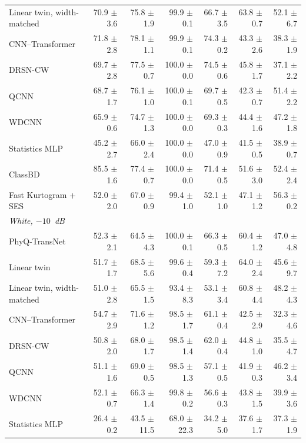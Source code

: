 \begin{table}[p]
\begin{tabular}{lrrrrrr}
Linear twin, width-matched & 70.9 $\pm$ 3.6 & 75.8 $\pm$ 1.9 & 99.9 $\pm$ 0.1 & 66.7 $\pm$ 3.5 & 63.8 $\pm$ 0.7 & 52.1 $\pm$ 6.7 \\
CNN--Transformer & 71.8 $\pm$ 2.8 & 78.1 $\pm$ 1.1 & 99.9 $\pm$ 0.1 & 74.3 $\pm$ 0.2 & 43.3 $\pm$ 2.6 & 38.3 $\pm$ 1.9 \\
DRSN-CW & 69.7 $\pm$ 2.8 & 77.5 $\pm$ 0.7 & 100.0 $\pm$ 0.0 & 74.5 $\pm$ 0.6 & 45.8 $\pm$ 1.7 & 37.1 $\pm$ 2.2 \\
QCNN & 68.7 $\pm$ 1.7 & 76.1 $\pm$ 1.0 & 100.0 $\pm$ 0.1 & 69.7 $\pm$ 0.5 & 42.3 $\pm$ 0.7 & 51.4 $\pm$ 2.2 \\
WDCNN & 65.9 $\pm$ 0.6 & 74.7 $\pm$ 1.3 & 100.0 $\pm$ 0.0 & 69.3 $\pm$ 0.3 & 44.4 $\pm$ 1.6 & 47.2 $\pm$ 1.8 \\
Statistics MLP & 45.2 $\pm$ 2.7 & 66.0 $\pm$ 2.4 & 100.0 $\pm$ 0.0 & 47.0 $\pm$ 0.9 & 41.5 $\pm$ 0.5 & 38.9 $\pm$ 0.7 \\
ClassBD & 85.5 $\pm$ 1.6 & 77.4 $\pm$ 0.7 & 100.0 $\pm$ 0.0 & 71.4 $\pm$ 0.5 & 51.6 $\pm$ 3.0 & 52.4 $\pm$ 2.4 \\
Fast Kurtogram + SES & 52.0 $\pm$ 2.0 & 67.0 $\pm$ 0.9 & 99.4 $\pm$ 1.0 & 52.1 $\pm$ 1.0 & 47.1 $\pm$ 1.2 & 56.3 $\pm$ 0.2 \\
\midrule
\multicolumn{7}{l}{\emph{White, $-10$~dB}} \\
PhyQ-TransNet & 52.3 $\pm$ 2.1 & 64.5 $\pm$ 4.3 & 100.0 $\pm$ 0.1 & 66.3 $\pm$ 0.5 & 60.4 $\pm$ 1.2 & 47.0 $\pm$ 4.8 \\
Linear twin & 51.7 $\pm$ 1.7 & 68.5 $\pm$ 5.6 & 99.6 $\pm$ 0.4 & 59.3 $\pm$ 7.2 & 64.0 $\pm$ 2.4 & 45.6 $\pm$ 9.7 \\
Linear twin, width-matched & 51.0 $\pm$ 2.8 & 65.5 $\pm$ 1.5 & 93.4 $\pm$ 8.3 & 53.1 $\pm$ 3.4 & 60.8 $\pm$ 4.4 & 48.2 $\pm$ 4.3 \\
CNN--Transformer & 54.7 $\pm$ 2.9 & 71.6 $\pm$ 1.2 & 98.5 $\pm$ 1.7 & 61.1 $\pm$ 0.4 & 42.5 $\pm$ 2.9 & 32.3 $\pm$ 4.6 \\
DRSN-CW & 50.8 $\pm$ 2.0 & 68.0 $\pm$ 1.7 & 98.5 $\pm$ 1.4 & 62.0 $\pm$ 0.4 & 44.8 $\pm$ 1.0 & 35.5 $\pm$ 4.7 \\
QCNN & 51.1 $\pm$ 1.6 & 69.0 $\pm$ 0.5 & 98.5 $\pm$ 1.3 & 57.1 $\pm$ 0.5 & 41.9 $\pm$ 0.3 & 46.2 $\pm$ 3.4 \\
WDCNN & 52.1 $\pm$ 0.7 & 66.3 $\pm$ 1.4 & 99.8 $\pm$ 0.2 & 56.6 $\pm$ 0.3 & 43.8 $\pm$ 1.5 & 39.9 $\pm$ 3.6 \\
Statistics MLP & 26.4 $\pm$ 0.2 & 43.5 $\pm$ 11.5 & 68.0 $\pm$ 22.3 & 34.2 $\pm$ 5.0 & 37.6 $\pm$ 1.7 & 37.3 $\pm$ 1.9 \\

\end{tabular}
\end{table}
